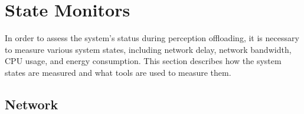 


\section{State Monitors}\label{sec:state_monitors}


In order to assess the system's status during perception offloading, it is necessary to measure various system states, including network delay, network bandwidth, CPU usage, and energy consumption. This section describes how the system states are measured and what tools are used to measure them. 

\subsection{Network}

